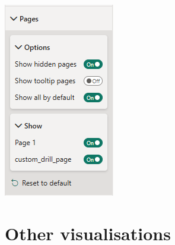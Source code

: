 \documentclass[10pt, openany, twocolumn]{book}
\begin{document}
\begin{center}
    \includegraphics[width=0.45\columnwidth]{images/page_nav.png}
\end{center}
\section{Other visualisations}
\end{document}
